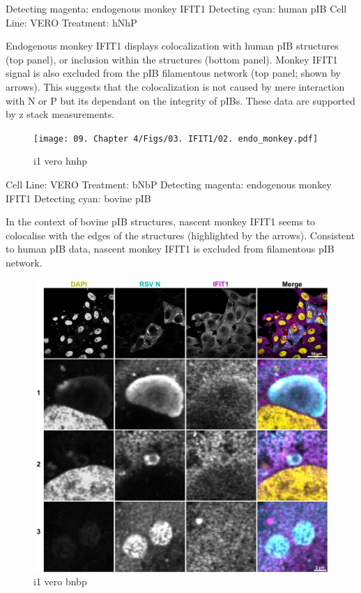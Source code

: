 Detecting magenta: endogenous monkey IFIT1 \newline
Detecting cyan: human pIB \newline
Cell Line: VERO \newline
Treatment: hNhP \newline

Endogenous monkey IFIT1 displays colocalization with human pIB structures (top panel), or inclusion within the structures (bottom panel). Monkey IFIT1 signal is also excluded from the pIB filamentous network (top panel; shown by arrows). This suggests that the colocalization is not caused by mere interaction with N or P but its dependant on the integrity of pIBs. These data are supported by z stack measurements.  

\begin{figure}
    \centering
    \texttt{[image: 09. Chapter 4/Figs/03. IFIT1/02. endo\_monkey.pdf]}
    \caption[i1 vero hnhp]{i1 vero hnhp}
    \label{fig:i1 vero hnhp}
\end{figure}


Cell Line: VERO \newline
Treatment: bNbP \newline
Detecting magenta: endogenous monkey IFIT1 \newline
Detecting cyan: bovine pIB \newline

In the context of bovine pIB structures, nascent monkey IFIT1 seems to colocalise with the edges of the structures (highlighted by the arrows). Consistent to human pIB data, nascent monkey IFIT1 is excluded from filamentous pIB network.


\begin{figure}
    \centering
    \includegraphics[width=1\linewidth]{09. Chapter 4/Figs/03. IFIT1/03. endo_monkey_bovine-pIB.pdf}
    \caption[i1 vero bnbp]{i1 vero bnbp}
    \label{fig:i1 vero bnbp}
\end{figure}

